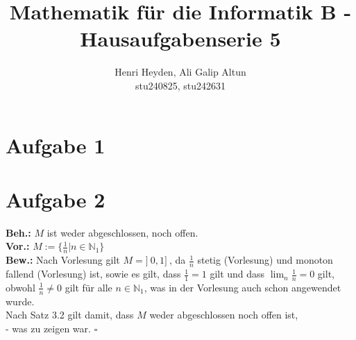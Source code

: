 \documentclass[12pt, a4paper]{article}
\title{Mathematik für die Informatik B - Hausaufgabenserie 5}
\author{Henri Heyden, Ali Galip Altun \\ \small stu240825, stu242631}
\date{}
\newcommand*{\qed}{\null\nobreak\hfill\ensuremath{\square}}
\begin{document}
\maketitle


\doublespacing

\section*{Aufgabe 1}
\section*{Aufgabe 2}
\textbf{Beh.:} \(M\) ist weder abgeschlossen, noch offen. \\
\textbf{Vor.:} \(M := \{\frac{1}{n} | n \in \mathbb{N}_1\}\) \\
\textbf{Bew.:} Nach Vorlesung gilt \(M = ]\ 0,1 ]\ \), da \(\frac{1}{n}\) stetig (Vorlesung) und monoton fallend (Vorlesung) ist, sowie es gilt, dass \(\frac{1}{1} = 1\) gilt und dass \(\lim_{n} \frac{1}{n} = 0\) gilt, obwohl \(\frac{1}{n} \ne 0\) gilt für alle \(n \in \mathbb{N}_1\), was in der Vorlesung auch schon angewendet wurde. \\
Nach Satz 3.2 gilt damit, dass \(M\) weder abgeschlossen noch offen ist,\\
- was zu zeigen war. \qed
\end{document}
